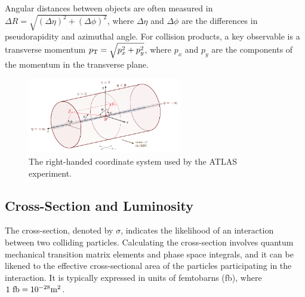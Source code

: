 Angular distances between objects are often measured in $\Delta R = \sqrt{(\Delta \eta)^2 + (\Delta \phi)^2}$, where $\Delta \eta$ and $\Delta \phi$ are the differences in pseudorapidity and azimuthal angle.
For collision products, a key observable is a transverse momentum $p_\mathrm{T}=\sqrt{p_x^2 + p_y^2}$, where $p_x$ and $p_y$ are the components of the momentum in the transverse plane.

\begin{figure}
    \centering
    \includegraphics[width=0.6\textwidth]{Feynman/coordinate.pdf}
    \caption{The right-handed coordinate system used by the ATLAS experiment.}
    \label{fig:atlas_coordinate_system}
\end{figure}

\subsection{Cross-Section and Luminosity}

The cross-section, denoted by $\sigma$, indicates the likelihood of an interaction between two colliding particles.
Calculating the cross-section involves quantum mechanical transition matrix elements and phase space integrals, and it can be likened to the effective cross-sectional area of the particles participating in the interaction.
It is typically expressed in units of femtobarns (fb), where $1~\fb = 10^{-28}\unit{\meter^2}$.

